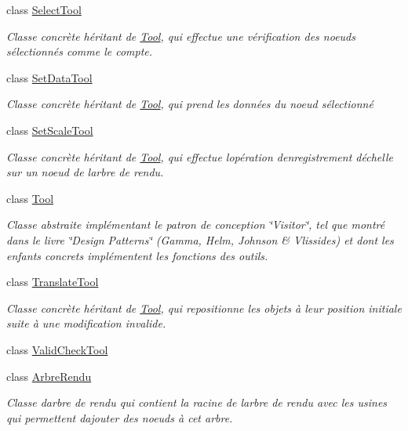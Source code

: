 \begin{DoxyCompactItemize}
class \hyperlink{class_select_tool}{Select\+Tool}
\begin{DoxyCompactList}\small\item\em Classe concrète héritant de \hyperlink{class_tool}{Tool}, qui effectue une vérification des noeuds sélectionnés comme le compte. \end{DoxyCompactList}\item 
class \hyperlink{class_set_data_tool}{Set\+Data\+Tool}
\begin{DoxyCompactList}\small\item\em Classe concrète héritant de \hyperlink{class_tool}{Tool}, qui prend les données du noeud sélectionné \end{DoxyCompactList}\item 
class \hyperlink{class_set_scale_tool}{Set\+Scale\+Tool}
\begin{DoxyCompactList}\small\item\em Classe concrète héritant de \hyperlink{class_tool}{Tool}, qui effectue l\textquotesingle{}opération d\textquotesingle{}enregistrement d\textquotesingle{}échelle sur un noeud de l\textquotesingle{}arbre de rendu. \end{DoxyCompactList}\item 
class \hyperlink{class_tool}{Tool}
\begin{DoxyCompactList}\small\item\em Classe abstraite implémentant le patron de conception \char`\"{}\+Visitor\char`\"{}, tel que montré dans le livre \char`\"{}\+Design Patterns\char`\"{} (Gamma, Helm, Johnson \& Vlissides) et dont les enfants concrets implémentent les fonctions des outils. \end{DoxyCompactList}\item 
class \hyperlink{class_translate_tool}{Translate\+Tool}
\begin{DoxyCompactList}\small\item\em Classe concrète héritant de \hyperlink{class_tool}{Tool}, qui repositionne les objets à leur position initiale suite à une modification invalide. \end{DoxyCompactList}\item 
class \hyperlink{class_valid_check_tool}{Valid\+Check\+Tool}
\item 
class \hyperlink{class_arbre_rendu}{Arbre\+Rendu}
\begin{DoxyCompactList}\small\item\em Classe d\textquotesingle{}arbre de rendu qui contient la racine de l\textquotesingle{}arbre de rendu avec les usines qui permettent d\textquotesingle{}ajouter des noeuds à cet arbre. \end{DoxyCompactList}\item 

\end{DoxyCompactItemize}
